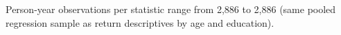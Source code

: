 Person-year observations per statistic range from 2{,}886 to 2{,}886 (same pooled regression sample as return descriptives by age and education).

